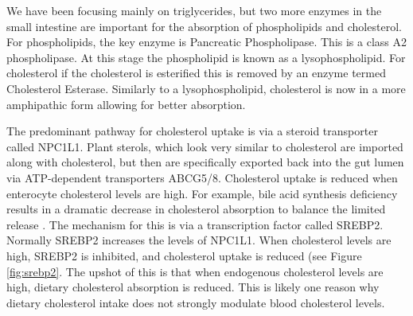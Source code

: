 \documentclass{tufte-handout}
\begin{document}
  We have been focusing mainly on triglycerides, but two more enzymes in the small intestine are important for the absorption of phospholipids and cholesterol.  For phospholipids, the key enzyme is Pancreatic Phospholipase.  This is a class A2 phospholipase.  At this stage the phospholipid is known as a lysophospholipid.  For cholesterol if the cholesterol is esterified this is removed by an enzyme termed Cholesterol Esterase.  Similarly to a lysophospholipid, cholesterol is now in a more amphipathic form allowing for better absorption.


  The predominant pathway for cholesterol uptake is via a steroid transporter called NPC1L1\citep{Altmann2004,Iqbal2005}.  Plant sterols, which look very similar to cholesterol are imported along with cholesterol, but then are specifically exported back into the gut lumen via ATP-dependent transporters ABCG5/8.  Cholesterol uptake is reduced when enterocyte cholesterol levels are high. For example, bile acid synthesis deficiency results in a dramatic decrease in cholesterol absorption to balance the limited release \citep{Repa2000,Wang2007d}.  The mechanism for this is via a transcription factor called SREBP2.  Normally SREBP2 increases the levels of NPC1L1.  When cholesterol levels are high, SREBP2 is inhibited, and cholesterol uptake is reduced (see Figure \ref{fig:srebp2}.  The upshot of this is that when endogenous cholesterol levels are high, dietary cholesterol absorption is reduced.  This is likely one reason why dietary cholesterol intake does not strongly modulate blood cholesterol levels.
\end{document}
